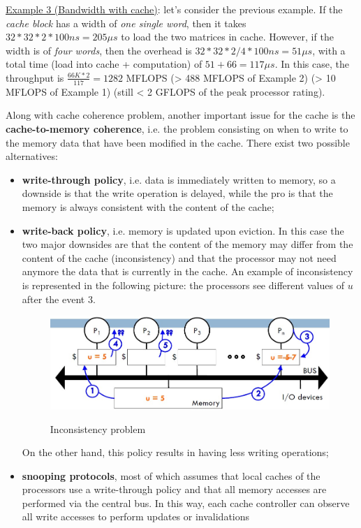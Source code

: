 \underline{Example 3 (Bandwidth with cache)}: let's consider the previous example. If the \textit{cache block} has a width of \textit{one single word}, then it takes $32*32*2*100 ns = 205 \mu s$ to load the two matrices in cache. However, if the width is of \textit{four words}, then the overhead is $32*32*2/4*100 ns = 51 \mu s$, with a total time (load into cache + computation) of $51 + 66 = 117 \mu s$. In this case, the throughput is $\frac{66K * 2}{117} = 1282$ MFLOPS (> 488 MFLOPS of Example 2) (> 10 MFLOPS of Example 1) (still < 2 GFLOPS of the peak processor rating).

Along with cache coherence problem, another important issue for the cache is the \textbf{cache-to-memory coherence}, i.e. the problem consisting on when to write to the memory data that have been modified in the cache. There exist two possible alternatives:

\begin{itemize}

    \item \textbf{write-through policy}, i.e. data is immediately written to memory, so a downside is that the write operation is delayed, while the pro is that the memory is always consistent with the content of the cache;

    \item \textbf{write-back policy}, i.e. memory is updated upon eviction. In this case the two major downsides are that the content of the memory may differ from the content of the cache (inconsistency) and that the processor may not need anymore the data that is currently in the cache. An example of inconsistency is represented in the following picture: the processors see different values of $u$ after the event 3.

    \begin{figure}[h!]
		\centering
		\includegraphics[scale = 0.8]{img/inconsistency.jpg}
        \label{inconsistency}
        \caption{Inconsistency problem}
    \end{figure}
    
    On the other hand, this policy results in having less writing operations;

    \item \textbf{snooping protocols}, most of which assumes that local caches of the processors use a write-through policy and that all memory accesses are performed via the central bus. In this way, each cache controller can observe all write accesses to perform updates or invalidations
    
\end{itemize}

